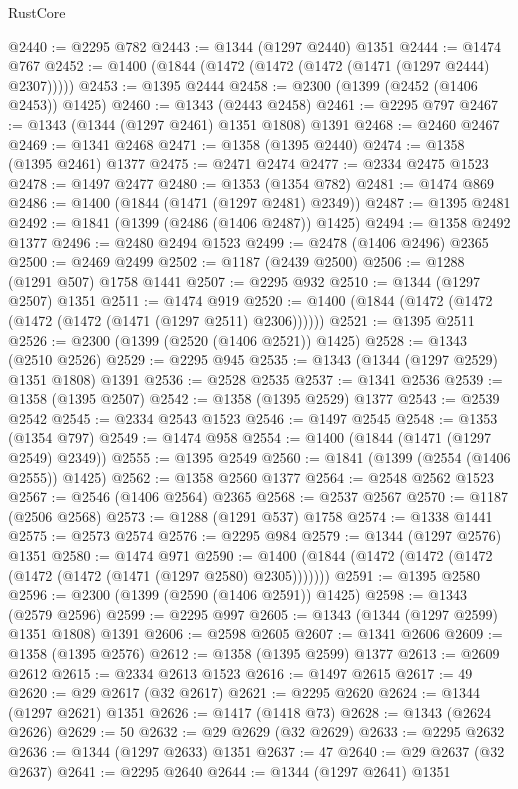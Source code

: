 \begin{lexlean}{RustCore}
\begin{coremodule}
@2440 := @2295 @782
@2443 := @1344 (@1297 @2440) @1351
@2444 := @1474 @767
@2452 := @1400 (@1844 (@1472 (@1472 (@1472 (@1471 (@1297 @2444) @2307)))))
@2453 := @1395 @2444
@2458 := @2300 (@1399 (@2452 (@1406 @2453)) @1425)
@2460 := @1343 (@2443 @2458)
@2461 := @2295 @797
@2467 := @1343 (@1344 (@1297 @2461) @1351 @1808) @1391
@2468 := @2460 @2467
@2469 := @1341 @2468
@2471 := @1358 (@1395 @2440)
@2474 := @1358 (@1395 @2461) @1377
@2475 := @2471 @2474
@2477 := @2334 @2475 @1523
@2478 := @1497 @2477
@2480 := @1353 (@1354 @782)
@2481 := @1474 @869
@2486 := @1400 (@1844 (@1471 (@1297 @2481) @2349))
@2487 := @1395 @2481
@2492 := @1841 (@1399 (@2486 (@1406 @2487)) @1425)
@2494 := @1358 @2492 @1377
@2496 := @2480 @2494 @1523
@2499 := @2478 (@1406 @2496) @2365
@2500 := @2469 @2499
@2502 := @1187 (@2439 @2500)
@2506 := @1288 (@1291 @507) @1758 @1441
@2507 := @2295 @932
@2510 := @1344 (@1297 @2507) @1351
@2511 := @1474 @919
@2520 := @1400 (@1844 (@1472 (@1472 (@1472 (@1472 (@1471 (@1297 @2511) @2306))))))
@2521 := @1395 @2511
@2526 := @2300 (@1399 (@2520 (@1406 @2521)) @1425)
@2528 := @1343 (@2510 @2526)
@2529 := @2295 @945
@2535 := @1343 (@1344 (@1297 @2529) @1351 @1808) @1391
@2536 := @2528 @2535
@2537 := @1341 @2536
@2539 := @1358 (@1395 @2507)
@2542 := @1358 (@1395 @2529) @1377
@2543 := @2539 @2542
@2545 := @2334 @2543 @1523
@2546 := @1497 @2545
@2548 := @1353 (@1354 @797)
@2549 := @1474 @958
@2554 := @1400 (@1844 (@1471 (@1297 @2549) @2349))
@2555 := @1395 @2549
@2560 := @1841 (@1399 (@2554 (@1406 @2555)) @1425)
@2562 := @1358 @2560 @1377
@2564 := @2548 @2562 @1523
@2567 := @2546 (@1406 @2564) @2365
@2568 := @2537 @2567
@2570 := @1187 (@2506 @2568)
@2573 := @1288 (@1291 @537) @1758
@2574 := @1338 @1441
@2575 := @2573 @2574
@2576 := @2295 @984
@2579 := @1344 (@1297 @2576) @1351
@2580 := @1474 @971
@2590 := @1400 (@1844 (@1472 (@1472 (@1472 (@1472 (@1472 (@1471 (@1297 @2580) @2305)))))))
@2591 := @1395 @2580
@2596 := @2300 (@1399 (@2590 (@1406 @2591)) @1425)
@2598 := @1343 (@2579 @2596)
@2599 := @2295 @997
@2605 := @1343 (@1344 (@1297 @2599) @1351 @1808) @1391
@2606 := @2598 @2605
@2607 := @1341 @2606
@2609 := @1358 (@1395 @2576)
@2612 := @1358 (@1395 @2599) @1377
@2613 := @2609 @2612
@2615 := @2334 @2613 @1523
@2616 := @1497 @2615
@2617 := 49
@2620 := @29 @2617 (@32 @2617)
@2621 := @2295 @2620
@2624 := @1344 (@1297 @2621) @1351
@2626 := @1417 (@1418 @73)
@2628 := @1343 (@2624 @2626)
@2629 := 50
@2632 := @29 @2629 (@32 @2629)
@2633 := @2295 @2632
@2636 := @1344 (@1297 @2633) @1351
@2637 := 47
@2640 := @29 @2637 (@32 @2637)
@2641 := @2295 @2640
@2644 := @1344 (@1297 @2641) @1351

\end{coremodule}
\end{lexlean}
